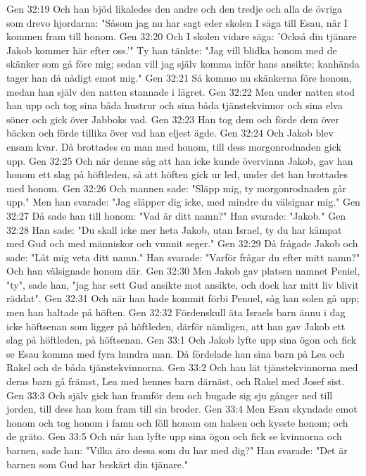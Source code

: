 Gen 32:19  Och han bjöd likaledes den andre och den tredje och alla de övriga som drevo hjordarna: "Såsom jag nu har sagt eder skolen I säga till Esau, när I kommen fram till honom.
Gen 32:20  Och I skolen vidare säga: 'Också din tjänare Jakob kommer här efter oss.'" Ty han tänkte: "Jag vill blidka honom med de skänker som gå före mig; sedan vill jag själv komma inför hans ansikte; kanhända tager han då nådigt emot mig."
Gen 32:21  Så kommo nu skänkerna före honom, medan han själv den natten stannade i lägret.
Gen 32:22  Men under natten stod han upp och tog sina båda hustrur och sina båda tjänstekvinnor och sina elva söner och gick över Jabboks vad.
Gen 32:23  Han tog dem och förde dem över bäcken och förde tillika över vad han eljest ägde.
Gen 32:24  Och Jakob blev ensam kvar. Då brottades en man med honom, till dess morgonrodnaden gick upp.
Gen 32:25  Och när denne såg att han icke kunde övervinna Jakob, gav han honom ett slag på höftleden, så att höften gick ur led, under det han brottades med honom.
Gen 32:26  Och mannen sade: "Släpp mig, ty morgonrodnaden går upp." Men han svarade: "Jag släpper dig icke, med mindre du välsignar mig."
Gen 32:27  Då sade han till honom: "Vad är ditt namn?" Han svarade: "Jakob."
Gen 32:28  Han sade: "Du skall icke mer heta Jakob, utan Israel, ty du har kämpat med Gud och med människor och vunnit seger."
Gen 32:29  Då frågade Jakob och sade: "Låt mig veta ditt namn." Han svarade: "Varför frågar du efter mitt namn?" Och han välsignade honom där.
Gen 32:30  Men Jakob gav platsen namnet Peniel, "ty", sade han, "jag har sett Gud ansikte mot ansikte, och dock har mitt liv blivit räddat".
Gen 32:31  Och när han hade kommit förbi Penuel, såg han solen gå upp; men han haltade på höften.
Gen 32:32  Fördenskull äta Israels barn ännu i dag icke höftsenan som ligger på höftleden, därför nämligen, att han gav Jakob ett slag på höftleden, på höftsenan.
Gen 33:1  Och Jakob lyfte upp sina ögon och fick se Esau komma med fyra hundra man. Då fördelade han sina barn på Lea och Rakel och de båda tjänstekvinnorna.
Gen 33:2  Och han lät tjänstekvinnorna med deras barn gå främst, Lea med hennes barn därnäst, och Rakel med Josef sist.
Gen 33:3  Och själv gick han framför dem och bugade sig sju gånger ned till jorden, till dess han kom fram till sin broder.
Gen 33:4  Men Esau skyndade emot honom och tog honom i famn och föll honom om halsen och kysste honom; och de gräto.
Gen 33:5  Och när han lyfte upp sina ögon och fick se kvinnorna och barnen, sade han: "Vilka äro dessa som du har med dig?" Han svarade: "Det är barnen som Gud har beskärt din tjänare."
